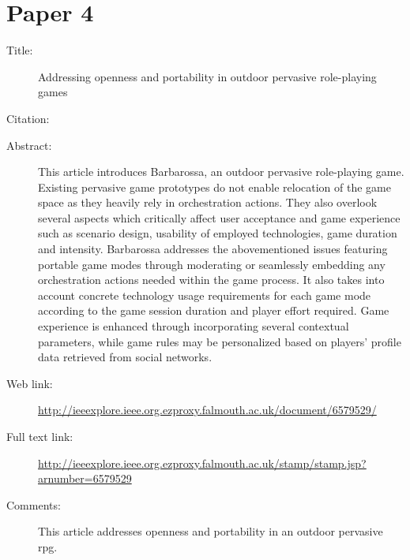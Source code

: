\documentclass{scrartcl}
\begin{document}
\section*{Paper 4}
\begin{description}
\item[Title:] Addressing openness and portability in outdoor pervasive role-playing games
\item[Citation:] \cite{6579529}
\item[Abstract:] This article introduces Barbarossa, an outdoor pervasive role-playing game. Existing pervasive game prototypes do not enable relocation of the game space as they heavily rely in orchestration actions. They also overlook several aspects which critically affect user acceptance and game experience such as scenario design, usability of employed technologies, game duration and intensity. Barbarossa addresses the abovementioned issues featuring portable game modes through moderating or seamlessly embedding any orchestration actions needed within the game process. It also takes into account concrete technology usage requirements for each game mode according to the game session duration and player effort required. Game experience is enhanced through incorporating several contextual parameters, while game rules may be personalized based on players' profile data retrieved from social networks.
\item[Web link:] \url{http://ieeexplore.ieee.org.ezproxy.falmouth.ac.uk/document/6579529/}
\item[Full text link:] \url{http://ieeexplore.ieee.org.ezproxy.falmouth.ac.uk/stamp/stamp.jsp?arnumber=6579529}
\item[Comments:] This article addresses openness and portability in an outdoor pervasive rpg. 
\end{description}
\end{document}
